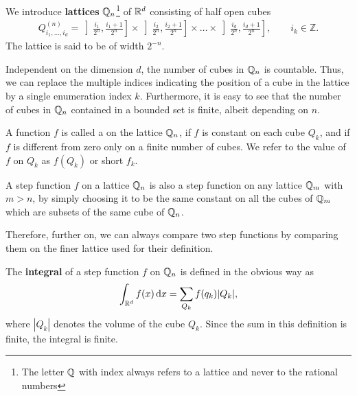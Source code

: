 \begin{definition}
   We introduce \textbf{lattices}
  $\mathbb Q_n$\footnote{The letter $\mathbb Q$ with index always refers to a
    lattice and never to the rational numbers} of $\mathbb R^d$ consisting of
  half open cubes
  \begin{gather*}
    Q^{(n)}_{i_1,\dots,i_d} =
    \left]\tfrac{i_1}{2^n},\tfrac{i_1+1}{2^n}\right]
    \times
    \left]\tfrac{i_2}{2^n},\tfrac{i_2+1}{2^n}\right]
    \times\dots\times
    \left]\tfrac{i_d}{2^n},\tfrac{i_d+1}{2^n}\right],
    \qquad i_k\in\mathbb Z.
  \end{gather*}
  The lattice is said to be of width $2^{-n}$.
\end{definition}

\begin{note}
  Independent on the dimension $d$, the number of cubes in $\mathbb Q_n$ is
  countable. Thus, we can replace the multiple indices indicating the
  position of a cube in the lattice by a single enumeration index
  $k$. Furthermore, it is easy to see that the number of cubes in
  $\mathbb Q_n$ contained in a bounded set is finite, albeit depending on $n$.
\end{note}

\begin{definition}
  A function $f$ is called a  on the lattice
  $\mathbb Q_n$, if $f$ is constant on each cube $Q_k$, and if $f$ is different from zero only on a finite number of cubes.
  We refer to the value of $f$ on $Q_k$ as $f(Q_k)$ or short $f_k$.
\end{definition}

\begin{note}
  A step function $f$ on a lattice $\mathbb Q_n$ is also a step function on
  any lattice $\mathbb Q_m$ with $m>n$, by simply choosing it to be the same
  constant on all the cubes of $\mathbb Q_m$ which are subsets of the same
  cube of $\mathbb Q_n$.
  
  Therefore, further on, we can always compare two step functions by
  comparing them on the finer lattice used for their definition.
\end{note}


\begin{definition}
  The \textbf{integral} of a step function $f$ on $\mathbb Q_n$ is
  defined in the obvious way as
  \begin{gather*}
    \int_{\mathbb R^d} f(x) \,\mathrm{d} x = \sum_{Q_k} f(q_k) |Q_k|,
  \end{gather*}
  where $|Q_k|$ denotes the volume of the cube $Q_k$. Since the sum in this definition is finite, the integral is finite.
\end{definition}


